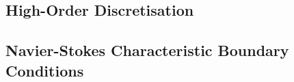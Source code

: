 \subsection{High-Order Discretisation}




\subsection{Navier-Stokes Characteristic Boundary Conditions}

\cite{thompson1987TimeDependentBoundary, thompson1990TimeDependentBoundaryConditions, poinsot1992BoundaryConditionsDirect, poinsot2005TheoreticalNumericalCombustion, sutherland2003ImprovedBoundaryConditions}














